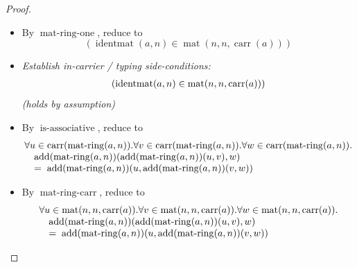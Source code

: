 \documentclass[11pt]{article}
\theoremstyle{plain}
\begin{document}
\begin{proof}
\begin{itemize}[leftmargin=2.8em, itemsep=4pt, parsep=1pt]
  \item[\textbf{44}] By $\operatorname{mat\text{-}ring\text{-}one}$, reduce to
\begin{equation*}
(\operatorname{identmat}(a, n) \in \operatorname{mat}(n, n, \operatorname{carr}(a)))
\end{equation*}

  \item[\textbf{45--46}] \emph{Establish in-carrier / typing side-conditions:}
\begin{equation*}
\begin{array}{@{}l@{}}
(\operatorname{identmat}(a, n) \in \operatorname{mat}(n, n, \operatorname{carr}(a)))
\end{array}
\end{equation*}
  \emph{(holds by assumption)}
  \item[\textbf{47}] By $\operatorname{is\text{-}associative}$, reduce to
\begin{equation*}
\begin{array}{@{}l@{}} \forall u \in \operatorname{carr}(\operatorname{mat\text{-}ring}(a, n)). \forall v \in \operatorname{carr}(\operatorname{mat\text{-}ring}(a, n)). \forall w \in \operatorname{carr}(\operatorname{mat\text{-}ring}(a, n)). \\ \quad \operatorname{add}(\operatorname{mat\text{-}ring}(a, n))(\operatorname{add}(\operatorname{mat\text{-}ring}(a, n))(u, v), w) \\ \quad =\; \operatorname{add}(\operatorname{mat\text{-}ring}(a, n))(u, \operatorname{add}(\operatorname{mat\text{-}ring}(a, n))(v, w)) \end{array}
\end{equation*}

  \item[\textbf{48}] By $\operatorname{mat\text{-}ring\text{-}carr}$, reduce to
\begin{equation*}
\begin{array}{@{}l@{}} \forall u \in \operatorname{mat}(n, n, \operatorname{carr}(a)). \forall v \in \operatorname{mat}(n, n, \operatorname{carr}(a)). \forall w \in \operatorname{mat}(n, n, \operatorname{carr}(a)). \\ \quad \operatorname{add}(\operatorname{mat\text{-}ring}(a, n))(\operatorname{add}(\operatorname{mat\text{-}ring}(a, n))(u, v), w) \\ \quad =\; \operatorname{add}(\operatorname{mat\text{-}ring}(a, n))(u, \operatorname{add}(\operatorname{mat\text{-}ring}(a, n))(v, w)) \end{array}
\end{equation*}


\end{itemize}
\end{proof}
\end{document}
